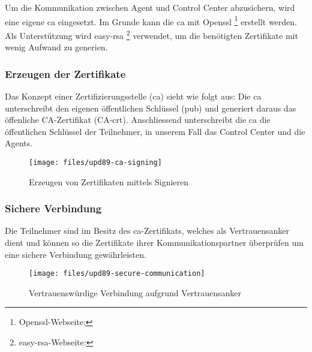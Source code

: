 Um die Kommunikation zwischen Agent und Control Center abzusichern, wird eine eigene \gls{ca} eingesetzt. Im Grunde kann die \gls{ca} mit Openssl \footnote{Openssl-Webseite: } erstellt werden. Als Unterstützung wird easy-rsa \footnote{easy-rsa-Webseite: } verwendet, um die benötigten Zertifikate mit wenig Aufwand zu generien.

\subsubsection*{Erzeugen der Zertifikate}
Das Konzept einer Zertifizierungsstelle (\gls{ca}) sieht wie folgt aus: Die \gls{ca} unterschreibt den eigenen öffentlichen Schlüssel (pub) und generiert daraus das öffenliche CA-Zertifikat (CA-crt). Anschliessend unterschreibt die \gls{ca} die öffentlichen Schlüssel der Teilnehmer, in unserem Fall das Control Center und die Agents.

\begin{figure}
  \centering
    \texttt{[image: files/upd89-ca-signing]}
  \caption{Erzeugen von Zertifikaten mittels Signieren}
  \label{fig:sec-signin}
\end{figure}

\clearpage
\subsubsection*{Sichere Verbindung}

Die Teilnehmer sind im Besitz des \gls{ca}-Zertifikats, welches als Vertrauensanker dient und können so die Zertifikate ihrer Kommunikationspartner überprüfen um eine sichere Verbindung gewährleisten.

\begin{figure}
  \centering
    \texttt{[image: files/upd89-secure-communication]}
  \caption{Vertrauenswürdige Verbindung aufgrund Vertrauensanker}
  \label{fig:sec-connection}
\end{figure}
